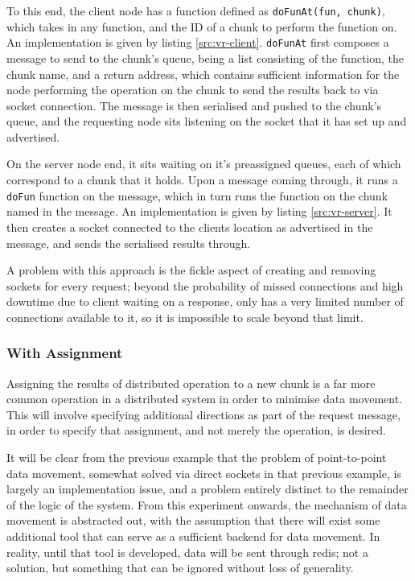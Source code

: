 To this end, the client node has a function defined as \texttt{doFunAt(fun,
chunk)}, which takes in any function, and the ID of a chunk to perform the
function on.
An implementation is given by listing \cref{src:vr-client}.
\texttt{doFunAt} first composes a message to send to the chunk's queue, being a
list consisting of the function, the chunk name, and a return address, which
contains sufficient information for the node performing the operation on the
chunk to send the results back to via socket connection.
The message is then serialised and pushed to the chunk's queue, and the
requesting node sits listening on the socket that it has set up and advertised.

On the server node end, it sits waiting on it's preassigned queues, each of
which correspond to a chunk that it holds. 
Upon a message coming through, it runs a \texttt{doFun} function on the
message, which in turn runs the function on the chunk named in the message. 
An implementation is given by listing \cref{src:vr-server}.
It then creates a socket connected to the clients location as advertised in
the message, and sends the serialised results through.

A problem with this approach is the fickle aspect of creating and removing
sockets for every request; beyond the probability of missed connections and
high downtime due to client waiting on a response, \R only has a very limited
number of connections available to it, so it is impossible to scale beyond that
limit.

\subsubsection{With Assignment}

Assigning the results of distributed operation to a new chunk is a far more
common operation in a distributed system in order to minimise data movement.
This will involve specifying additional directions as part of the request
message, in order to specify that assignment, and not merely the operation, is
desired.

It will be clear from the previous example that the problem of point-to-point
data movement, somewhat solved via direct sockets in that previous example, is
largely an implementation issue, and a problem entirely distinct to the
remainder of the logic of the system.
From this experiment onwards, the mechanism of data movement is abstracted out,
with the assumption that there will exist some additional tool that can serve
as a sufficient backend for data movement.
In reality, until that tool is developed, data will be sent through redis; not
a solution, but something that can be ignored without loss of generality.

